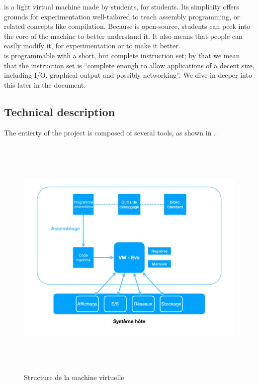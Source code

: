 \documentclass[11pt,twoside]{article}
\begin{document}
   is a light virtual machine made by students, for students. Its simplicity offers grounds for experimentation well-tailored to teach assembly programming, or related concepts like compilation. Because  is open-source, students can peek into the core of the machine to better understand it. It also means that people can easily modify it, for experimentation or to make it better.\\
   is programmable with a short, but complete instruction set; by that we mean that the instruction set is ``complete enough to allow applications of a decent size, including I/O, graphical output and possibly networking''. We dive in deeper into this later in the document.

  \subsection{Technical description}

  The entierty of the  project is composed of several tools, as shown in .
  \begin{figure}[tb]
    \centering
    \includegraphics[width=12cm, height=12cm, keepaspectratio]{diagram1_graph.pdf}
    \caption{Structure de la machine virtuelle }
    \label{fig:diagram1}
  \end{figure}
\end{document}
